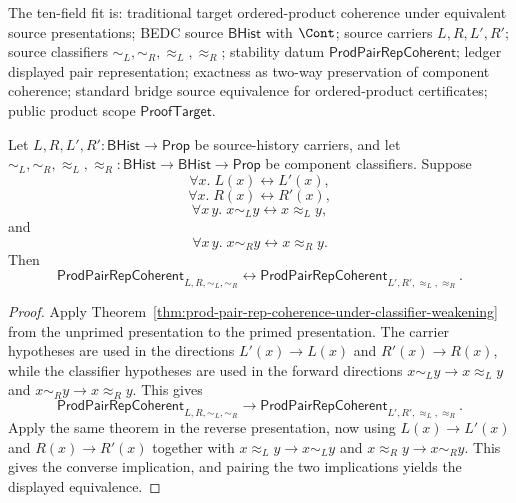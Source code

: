 \begin{theorem}
\label{thm:prod-pair-rep-coherence-source-equivalence}
The ten-field fit is: traditional target ordered-product coherence under
equivalent source presentations; BEDC source $\mathsf{BHist}$ with $\Cont$;
source carriers $L,R,L',R'$; source classifiers
$\sim_L,\sim_R,\approx_L,\approx_R$; stability datum
$\mathsf{ProdPairRepCoherent}$; ledger displayed pair representation; exactness
as two-way preservation of component coherence; standard bridge source
equivalence for ordered-product certificates; public product scope
$\mathsf{ProofTarget}$.

Let $L,R,L',R':\mathsf{BHist}\to\mathsf{Prop}$ be source-history carriers, and
let
$\sim_L,\sim_R,\approx_L,\approx_R:\mathsf{BHist}\to\mathsf{BHist}\to\mathsf{Prop}$
be component classifiers. Suppose
$$
\forall x.\;L(x)\leftrightarrow L'(x),
$$
$$
\forall x.\;R(x)\leftrightarrow R'(x),
$$
$$
\forall x\,y.\;x\sim_L y\leftrightarrow x\approx_L y,
$$
and
$$
\forall x\,y.\;x\sim_R y\leftrightarrow x\approx_R y.
$$
Then
$$
\mathsf{ProdPairRepCoherent}_{L,R,\sim_L,\sim_R}
\leftrightarrow
\mathsf{ProdPairRepCoherent}_{L',R',\approx_L,\approx_R}.
$$
\end{theorem}
\begin{proof}
Apply Theorem~\ref{thm:prod-pair-rep-coherence-under-classifier-weakening} from
the unprimed presentation to the primed presentation. The carrier hypotheses
are used in the directions $L'(x)\to L(x)$ and $R'(x)\to R(x)$, while the
classifier hypotheses are used in the forward directions
$x\sim_L y\to x\approx_L y$ and $x\sim_R y\to x\approx_R y$. This gives
$$
\mathsf{ProdPairRepCoherent}_{L,R,\sim_L,\sim_R}\to
\mathsf{ProdPairRepCoherent}_{L',R',\approx_L,\approx_R}.
$$
Apply the same theorem in the reverse presentation, now using
$L(x)\to L'(x)$ and $R(x)\to R'(x)$ together with
$x\approx_L y\to x\sim_L y$ and $x\approx_R y\to x\sim_R y$. This gives the
converse implication, and pairing the two implications yields the displayed
equivalence.
\end{proof}

